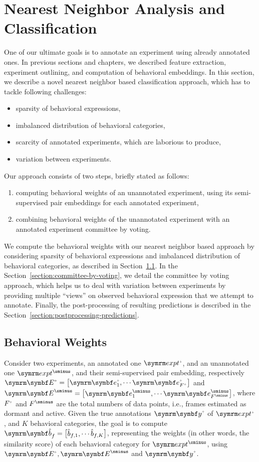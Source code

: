 \section{Nearest Neighbor Analysis and Classification}\label{section:nearest-neighbors-classification}
One of our ultimate goals is to annotate an experiment using already annotated ones.
In previous sections and chapters, we described feature extraction, experiment outlining, and computation of behavioral embeddings.
In this section, we describe a novel nearest neighbor based classification approach, which has to tackle following challenges:
\begin{itemize}
	\item sparsity of behavioral expressions,
	\item imbalanced distribution of behavioral categories,
	\item scarcity of annotated experiments, which are laborious to produce,
	\item variation between experiments.
\end{itemize}
Our approach consists of two steps, briefly stated as follows:
\begin{enumerate}
	\item computing behavioral weights of an unannotated experiment, using its semi-supervised pair embeddings for each annotated  experiment,
	\item combining behavioral weights of the unannotated experiment with an annotated experiment committee by voting.
\end{enumerate}
We compute the behavioral weights with our nearest neighbor based approach by considering sparsity of behavioral expressions and imbalanced distribution of behavioral categories, as described in Section~\ref{section:behavioral-weights}.
In the Section~\ref{section:committee-by-voting}, we detail the committee by voting approach, which helps us to deal with variation between experiments by providing multiple ``views'' on observed behavioral expression that we attempt to annotate. Finally, the post-processing of resulting predictions is described in the Section~\ref{section:postprocessing-predictions}.

\subsection{Behavioral Weights}\label{section:behavioral-weights}
Consider two experiments, an annotated one $\exptAnn$, and an unannotated one $\exptUnann$, and their semi-supervised pair embedding, respectively $\Ann{\V{E}}=\qmatrix{\Ann{\V{e}}_1, \cdots \Ann{\V{e}_{\Ann{F}}}}$ and $\Unann{\V{E}}=\qmatrix{\Unann{\V{e}}_1, \cdots \Unann{\V{e}}_{\Unann{F}}}$, where $\Ann{F}$ and $\Unann{F}$ are the total numbers of data points, i.e., frames estimated as dormant and active.
Given the true annotations $\Ann{\V{y}}$ of $\exptAnn$, and $K$ behavioral categories, the goal is to compute $\V{\hat{b}}_f=\qmatrix{\hat{b}_{f,1}, \cdots \hat{b}_{f,K}}$, representing the weights (in other words, the similarity score) of each behavioral category for $\exptUnann$, using $\Ann{\V{E}}, \Unann{\V{E}}$ and $\Ann{\V{y}}$.

